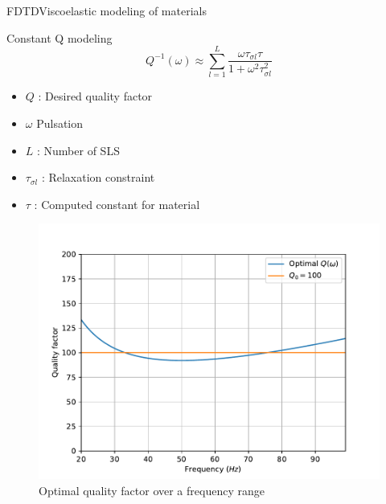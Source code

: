 \documentclass[9pt, xcolor={usenames, dvipsnames}]{beamer}
\begin{document}
				\begin{frame}{FDTD}{Viscoelastic modeling of materials}
					\begin{minipage}[t]{0.48\textwidth}

						\begin{alertblock}{Constant Q modeling}
							\begin{equation}
								Q^{-1}(\omega) \approx \sum_{l=1}^L \frac{\omega \tau_{\sigma l} \tau}{1 + \omega^2\tau_{\sigma l}^2}
							\end{equation}
							\begin{itemize}
								\item $Q$ : Desired quality factor 
								\item $\omega$ Pulsation
								\item $L$ : Number of SLS
								\item $\tau_{\sigma l}$ : Relaxation constraint
								\item $\tau$ : Computed constant for material
							\end{itemize}
						\end{alertblock}
					\end{minipage}
					\hfill
					\begin{minipage}[t]{0.48\textwidth}
						\begin{figure}
							\includegraphics[width=\textwidth]{images/quality_factor.pdf}
							\caption{Optimal quality factor over a frequency range}
						\end{figure}
					\end{minipage}
				\end{frame}
\end{document}
